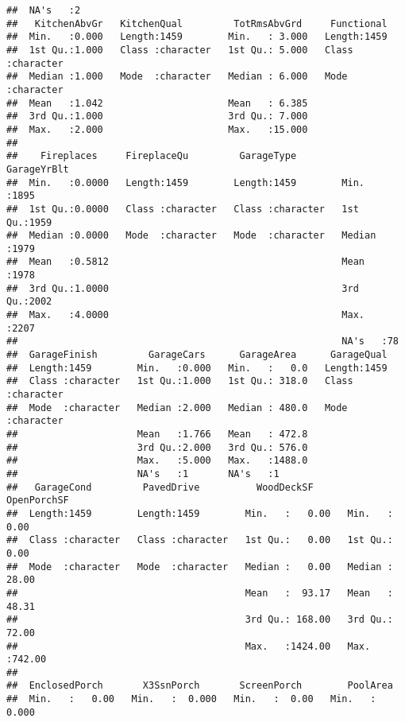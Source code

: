 \documentclass[
]{article}
\begin{document}
\begin{verbatim}
##  NA's   :2                                                        
##   KitchenAbvGr   KitchenQual         TotRmsAbvGrd     Functional       
##  Min.   :0.000   Length:1459        Min.   : 3.000   Length:1459       
##  1st Qu.:1.000   Class :character   1st Qu.: 5.000   Class :character  
##  Median :1.000   Mode  :character   Median : 6.000   Mode  :character  
##  Mean   :1.042                      Mean   : 6.385                     
##  3rd Qu.:1.000                      3rd Qu.: 7.000                     
##  Max.   :2.000                      Max.   :15.000                     
##                                                                        
##    Fireplaces     FireplaceQu         GarageType         GarageYrBlt  
##  Min.   :0.0000   Length:1459        Length:1459        Min.   :1895  
##  1st Qu.:0.0000   Class :character   Class :character   1st Qu.:1959  
##  Median :0.0000   Mode  :character   Mode  :character   Median :1979  
##  Mean   :0.5812                                         Mean   :1978  
##  3rd Qu.:1.0000                                         3rd Qu.:2002  
##  Max.   :4.0000                                         Max.   :2207  
##                                                         NA's   :78    
##  GarageFinish         GarageCars      GarageArea      GarageQual       
##  Length:1459        Min.   :0.000   Min.   :   0.0   Length:1459       
##  Class :character   1st Qu.:1.000   1st Qu.: 318.0   Class :character  
##  Mode  :character   Median :2.000   Median : 480.0   Mode  :character  
##                     Mean   :1.766   Mean   : 472.8                     
##                     3rd Qu.:2.000   3rd Qu.: 576.0                     
##                     Max.   :5.000   Max.   :1488.0                     
##                     NA's   :1       NA's   :1                          
##   GarageCond         PavedDrive          WoodDeckSF       OpenPorchSF    
##  Length:1459        Length:1459        Min.   :   0.00   Min.   :  0.00  
##  Class :character   Class :character   1st Qu.:   0.00   1st Qu.:  0.00  
##  Mode  :character   Mode  :character   Median :   0.00   Median : 28.00  
##                                        Mean   :  93.17   Mean   : 48.31  
##                                        3rd Qu.: 168.00   3rd Qu.: 72.00  
##                                        Max.   :1424.00   Max.   :742.00  
##                                                                          
##  EnclosedPorch       X3SsnPorch       ScreenPorch        PoolArea      
##  Min.   :   0.00   Min.   :  0.000   Min.   :  0.00   Min.   :  0.000  

\end{verbatim}
\end{document}

